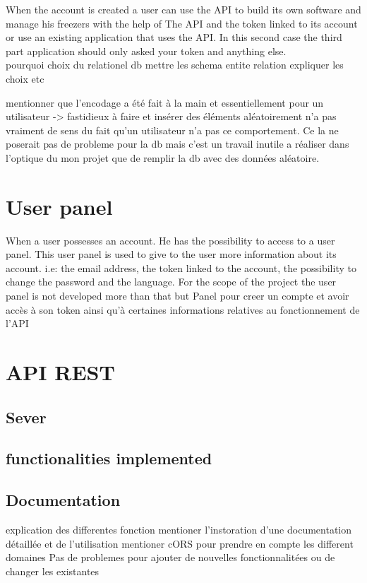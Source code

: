 When the account is created a user can use the API to build its own software and manage his freezers with the help of The API and the token linked to its account or use an existing application that uses the API. In this second case the third part application should only asked your token and anything else.\\

pourquoi choix du relationel db
mettre les schema entite relation expliquer les choix etc

 mentionner que l'encodage a été fait à la main et essentiellement pour un utilisateur -> fastidieux à faire et insérer des éléments aléatoirement n'a pas vraiment de sens du fait qu'un utilisateur n'a pas ce comportement. Ce la ne poserait pas de probleme pour la db mais c'est un travail inutile a réaliser dans l'optique du mon projet que de remplir la db avec des données aléatoire.
\section{User panel}
When a user possesses an account. He has the possibility to access to a user panel. This user panel is used to give to the user more information about its account. i.e: the email address, the token linked to the account, the possibility to change the password and the language. For the scope of the project the user panel is not developed more than that but
Panel pour creer un compte et avoir accès à son token ainsi qu'à certaines informations relatives au fonctionnement de l'API

\section{API REST}
\subsection{Sever}
\subsection{functionalities implemented}
\subsection{Documentation}
explication des differentes fonction
 mentioner l'instoration d'une documentation détaillée et de l'utilisation 
 mentioner cORS pour prendre en compte les different domaines
 Pas de problemes pour ajouter de nouvelles fonctionnalitées ou de changer les existantes
 
